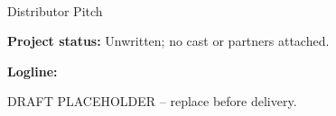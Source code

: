 \documentclass[11pt,letterpaper]{article}
\begin{document}
\begin{center}
{\Large\bfseries\sffamily \filmtitleupper}\\[6pt]
Distributor Pitch
\end{center}
\textbf{Project status:} Unwritten; no cast or partners attached.

\textbf{Logline:} \filmlogline

DRAFT PLACEHOLDER -- replace before delivery.
\end{document}
